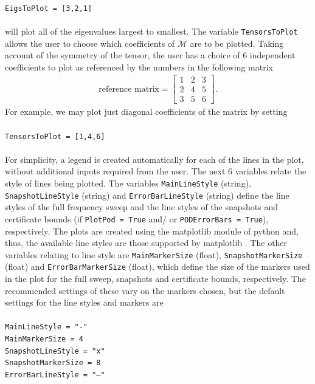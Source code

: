 \\
\texttt{EigsToPlot = [3,2,1]}\\
\\
will plot all of the eigenvalues largest to smallest. The variable \texttt{TensorsToPlot} allows the user to choose which  coefficients of $\mathcal{M}$ are to be plotted. Taking account of the symmetry of the tensor,  the user has a choice of 6 independent coefficients to plot as referenced by the numbers in the following matrix
\begin{align}
\textrm{reference matrix}=\left[\begin{array}{ccc}
1 & 2 & 3\\
2 & 4 & 5\\
3 & 5 & 6
\end{array}\right].
\end{align}
For example, we may plot just diagonal coefficients of the matrix by setting\\
\\
\texttt{TensorsToPlot = [1,4,6]}\\
\\
For simplicity, a legend is created automatically for each of the lines in the plot, without additional inputs required from the user. The next 6 variables relate the style of lines being plotted. The variables \texttt{MainLineStyle} (string), \texttt{SnapshotLineStyle} (string) and \texttt{ErrorBarLineStyle} (string) define the line styles of the full frequency sweep and the line styles of the snapshots and certificate bounds (if \texttt{PlotPod = True} and/ or \texttt{PODErrorBars = True}), respectively. The plots are created using the matplotlib module of python and, thus, the available line styles are those supported by matplotlib \cite{matplotlib}. The other variables relating to line style are \texttt{MainMarkerSize} (float), \texttt{SnapshotMarkerSize} (float) and \texttt{ErrorBarMarkerSize} (float), which define the size of the markers used in the plot for the full sweep, snapshots and certificate bounds, respectively. The recommended settings of these vary on the markers chosen, but the default settings for the line styles and markers are\\
\\
\texttt{MainLineStyle = "-"}
\\
\texttt{MainMarkerSize = 4}
\\
\texttt{SnapshotLineStyle = "x"}
\\
\texttt{SnapshotMarkerSize = 8}
\\
\texttt{ErrorBarLineStyle = "--"}
